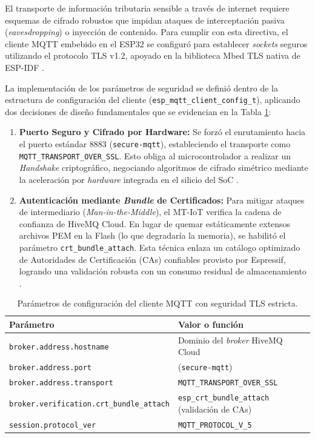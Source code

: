 \par El transporte de información tributaria sensible a través de internet requiere esquemas de cifrado robustos que impidan ataques de interceptación pasiva (\textit{eavesdropping}) o inyección de contenido. Para cumplir con esta directiva, el cliente MQTT embebido en el ESP32 se configuró para establecer \textit{sockets} seguros utilizando el protocolo TLS v1.2, apoyado en la biblioteca Mbed TLS nativa de ESP-IDF \cite{Espressif_ESP_IDF_v552}.\\

\par La implementación de los parámetros de seguridad se definió dentro de la estructura de configuración del cliente (\texttt{esp\_mqtt\_client\_config\_t}), aplicando dos decisiones de diseño fundamentales que se evidencian en la Tabla \ref{tab:tls_config}:

\begin{enumerate}
    \item \textbf{Puerto Seguro y Cifrado por Hardware:} Se forzó el enrutamiento hacia el puerto estándar 8883 (\texttt{secure-mqtt}), estableciendo el transporte como \texttt{MQTT\_\allowbreak TRANSPORT\_\allowbreak OVER\_\allowbreak SSL}. Esto obliga al microcontrolador a realizar un \textit{Handshake} criptográfico, negociando algoritmos de cifrado simétrico mediante la aceleración por \textit{hardware} integrada en el silicio del SoC \cite{Espressif_ESP32_Datasheet}.
    
    \item \textbf{Autenticación mediante \textit{Bundle} de Certificados:} Para mitigar ataques de intermediario (\textit{Man-in-the-Middle}), el MT-IoT verifica la cadena de confianza de HiveMQ Cloud. En lugar de quemar estáticamente extensos archivos PEM en la Flash (lo que degradaría la memoria), se habilitó el parámetro \texttt{crt\_bundle\_attach}. Esta técnica enlaza un catálogo optimizado de Autoridades de Certificación (CAs) confiables provisto por Espressif, logrando una validación robusta con un consumo residual de almacenamiento \cite{Espressif_ESP_IDF_v552}.
\end{enumerate}

\begin{table}[htbp]
\centering
\caption{Parámetros de configuración del cliente MQTT con seguridad TLS estricta.}
\label{tab:tls_config}
\begin{tabularx}{\textwidth}{@{}l >{\raggedright\arraybackslash}X@{}}
\toprule
\textbf{Parámetro} & \textbf{Valor o función} \\
\midrule
\texttt{broker.address.hostname} & Dominio del \textit{broker} HiveMQ Cloud \\
\texttt{broker.address.port} & 8883 (\texttt{secure-mqtt}) \\
\texttt{broker.address.transport} & \texttt{MQTT\_TRANSPORT\_OVER\_SSL} \\
\texttt{broker.verification.crt\_bundle\_attach} & \texttt{esp\_crt\_bundle\_attach} (validación de CAs) \\
\texttt{session.protocol\_ver} & \texttt{MQTT\_PROTOCOL\_V\_5} \\
\bottomrule
\end{tabularx}
\end{table}


